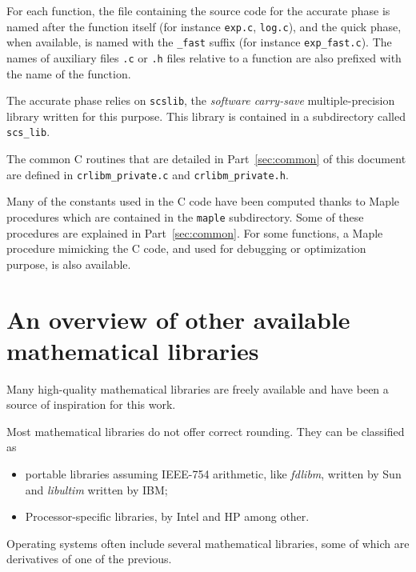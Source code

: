 For each function, the file containing the source code for the
accurate phase is named after the function itself (for instance
\texttt{exp.c}, \texttt{log.c}), and the quick phase, when available,
is named with the \texttt{\_fast} suffix (for instance
\texttt{exp\_fast.c}). The names of auxiliary files \texttt{.c} or
\texttt{.h} files relative to a function are also prefixed with the
name of the function.

The accurate phase relies on \texttt{scslib}, the \emph{software
  carry-save} multiple-precision library written for this purpose.
This library is contained in a subdirectory called \texttt{scs\_lib}.

The common C routines that are detailed in Part~\ref{sec:common} of
this document are defined in \texttt{crlibm\_private.c} and
\texttt{crlibm\_private.h}.

Many of the constants used in the C code have been computed thanks to
Maple procedures which are contained in the \texttt{maple}
subdirectory. Some of these procedures are explained in
Part~\ref{sec:common}. For some functions, a Maple procedure mimicking
the C code, and used for debugging or optimization purpose, is also
available.




\section{An overview of other  available mathematical libraries\label{section:lib-overview}}

Many high-quality mathematical libraries are freely available and have
been a source of inspiration for this work.

Most mathematical libraries do not offer correct rounding. They can be classified as 
\begin{itemize}
\item portable libraries  assuming IEEE-754
  arithmetic, like \emph{fdlibm}, written by Sun\cite{FDLIBMweb} and \emph{libultim}
  written by IBM\cite{IBMlibultimweb};
\item  Processor-specific libraries, by
  Intel\cite{HarKubStoTan99,IntelOpenSource} and
  HP\cite{Markstein2000,Markstein2001} among other.
\end{itemize}

Operating systems often include several mathematical libraries, some of which are derivatives of one
of the previous.

